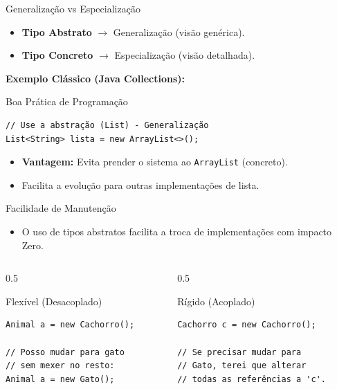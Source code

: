 \documentclass[9pt]{beamer}
\begin{document}
\begin{frame}[fragile]{Generalização vs Especialização}
\begin{itemize}
    \item \textbf{Tipo Abstrato} $\rightarrow$ Generalização (visão genérica).
    \item \textbf{Tipo Concreto} $\rightarrow$ Especialização (visão detalhada).
\end{itemize}

\vspace{0.3cm}

\textbf{Exemplo Clássico (Java Collections):}
\begin{block}{Boa Prática de Programação}
\begin{verbatim}
// Use a abstração (List) - Generalização
List<String> lista = new ArrayList<>();
\end{verbatim}
\end{block}

\begin{itemize}
    \item \textbf{Vantagem:} Evita prender o sistema ao \texttt{ArrayList} (concreto).
    \item Facilita a evolução para outras implementações de lista.
\end{itemize}
\end{frame}

\begin{frame}[fragile]{Facilidade de Manutenção}
\begin{itemize}
    \item O uso de tipos abstratos facilita a troca de implementações com impacto Zero.
\end{itemize}

\begin{columns}[t]
\begin{column}{0.5\textwidth}
\begin{block}{Flexível (Desacoplado)}
\begin{verbatim}
Animal a = new Cachorro();

// Posso mudar para gato
// sem mexer no resto:
Animal a = new Gato();
\end{verbatim}
\end{block}
\end{column}
\begin{column}{0.5\textwidth}
\begin{block}{Rígido (Acoplado)}
\begin{verbatim}
Cachorro c = new Cachorro();

// Se precisar mudar para
// Gato, terei que alterar 
// todas as referências a 'c'.
\end{verbatim}
\end{block}
\end{column}
\end{columns}
\end{frame}
\end{document}
